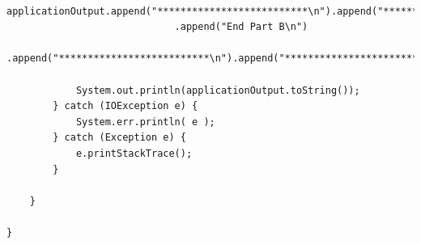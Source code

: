 \begin{lstlisting}
			applicationOutput.append("**************************\n").append("**************************\n").append("**************************\n")
							 .append("End Part B\n")
							 .append("**************************\n").append("**************************\n").append("**************************\n");
		
			System.out.println(applicationOutput.toString());
		} catch (IOException e) {
			System.err.println( e );
		} catch (Exception e) {
			e.printStackTrace();
		}
		
	}

}
\end{lstlisting}



